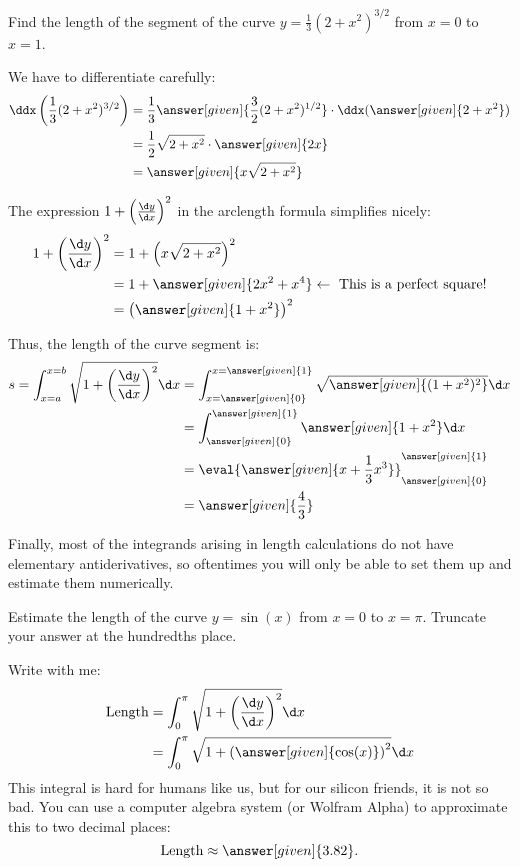 \documentclass{ximera}
\begin{document}
\begin{example}
Find the length of the segment of the curve $y=\frac{1}{3}(2+x^2)^{3/2}$ from $x=0$ to $x=1$.  

\begin{explanation}
We have to differentiate carefully:
\begin{align*}
\ddx\left(\frac{1}{3}(2+x^2)^{3/2}\right) &= \frac{1}{3} \answer[given]{\frac{3}{2}(2+x^2)^{1/2}} \cdot \ddx (\answer[given]{2+x^2}) \\
&= \frac{1}{2} \sqrt{2+x^2} \cdot \answer[given]{2x} \\
&= \answer[given]{x\sqrt{2+x^2}}
\end{align*}

The expression $1+\left(\frac{\d y}{\d x}\right)^2$ in the arclength formula simplifies nicely:
\begin{align*}
1+\left(\frac{\d y}{\d x}\right)^2 &= 1+\left(x\sqrt{2+x^2}\right)^2 \\
&= 1+ \answer[given]{2x^2+x^4} \leftarrow \textrm{ This is a perfect square!} \\
&= \left(\answer[given]{1+x^2}\right)^2
\end{align*}

Thus, the length of the curve segment is:
\begin{align*}
s  = \int_{x=a}^{x=b} \sqrt{1+ \left(\frac{\d y}{\d x}\right)^2} \d x &=  \int_{x=\answer[given]{0}}^{x=\answer[given]{1}} \sqrt{\answer[given]{(1+x^2)^2} }\d x \\
&= \int_{\answer[given]{0}}^{\answer[given]{1}} \answer[given]{1+x^2} \d x \\
&= \eval{\answer[given]{x+\frac{1}{3} x^3}}_{\answer[given]{0}}^{\answer[given]{1}}\\
&= \answer[given]{\frac{4}{3}}
\end{align*}
\end{explanation}
\end{example}

Finally, most of the integrands arising in length calculations do not have elementary antiderivatives, so oftentimes you will only be able to set them up and estimate them numerically.

\begin{example}
  Estimate the length of the curve $y = \sin(x)$ from $x=0$ to $x =  \pi$.  Truncate your answer at the hundredths place.
  \begin{explanation}
    Write with me:
    \begin{align*}
      \text{Length} &= \int_0^\pi \sqrt{1+\left( \frac{\d y}{ \d x}\right)^2} \d x\\
      &= \int_0^\pi \sqrt{1+\left(
        \answer[given]{\cos(x)}\right)^2} \d x
    \end{align*}
    This integral is hard for humans like us, but for our silicon
    friends, it is not so bad.  You can use a computer algebra system
    (or Wolfram Alpha) to approximate this to two decimal places:
    \[
    \text{Length} \approx \answer[given]{3.82}.
    \]
  \end{explanation}
\end{example}
\end{document}
